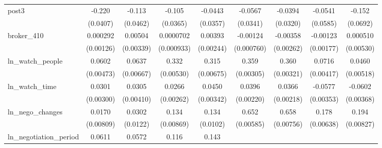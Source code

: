 {\begin{tabular}{l*{8}{c}}
\addlinespace
post3       &      -0.220\sym{***}&      -0.113\sym{**} &      -0.105\sym{***}&     -0.0443         &     -0.0567\sym{*}  &     -0.0394         &     -0.0541         &      -0.152\sym{**} \\
            &    (0.0407)         &    (0.0462)         &    (0.0365)         &    (0.0357)         &    (0.0341)         &    (0.0320)         &    (0.0585)         &    (0.0692)         \\
\addlinespace
broker\_410  &    0.000292         &     0.00504         &   0.0000702         &     0.00393         &    -0.00124         &    -0.00358         &    -0.00123         &    0.000510         \\
            &   (0.00126)         &   (0.00339)         &  (0.000933)         &   (0.00244)         &  (0.000760)         &   (0.00262)         &   (0.00177)         &   (0.00530)         \\
\addlinespace
ln\_watch\_people&      0.0602\sym{***}&      0.0637\sym{***}&       0.332\sym{***}&       0.315\sym{***}&       0.359\sym{***}&       0.360\sym{***}&      0.0716\sym{***}&      0.0460\sym{***}\\
            &   (0.00473)         &   (0.00667)         &   (0.00530)         &   (0.00675)         &   (0.00305)         &   (0.00321)         &   (0.00417)         &   (0.00518)         \\
\addlinespace
ln\_watch\_time&      0.0301\sym{***}&      0.0305\sym{***}&      0.0266\sym{***}&      0.0450\sym{***}&      0.0396\sym{***}&      0.0366\sym{***}&     -0.0577\sym{***}&     -0.0602\sym{***}\\
            &   (0.00300)         &   (0.00410)         &   (0.00262)         &   (0.00342)         &   (0.00220)         &   (0.00218)         &   (0.00353)         &   (0.00368)         \\
\addlinespace
ln\_nego\_changes&      0.0170\sym{**} &      0.0302\sym{**} &       0.134\sym{***}&       0.134\sym{***}&       0.652\sym{***}&       0.658\sym{***}&       0.178\sym{***}&       0.194\sym{***}\\
            &   (0.00809)         &    (0.0122)         &   (0.00869)         &    (0.0102)         &   (0.00585)         &   (0.00756)         &   (0.00638)         &   (0.00827)         \\
\addlinespace
ln\_negotiation\_period&      0.0611\sym{***}&      0.0572\sym{***}&       0.116\sym{***}&       0.143\sym{***}&                     &                     &                     &                     \\

\end{tabular}}
